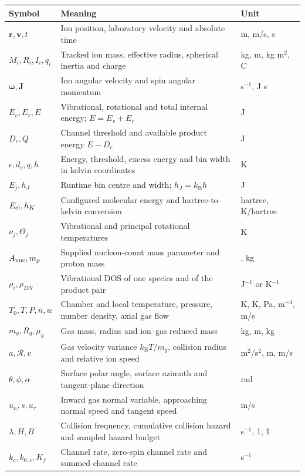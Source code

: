 \documentclass[10pt,a4paper]{article}
\newcommand{\kb}{k_{\mathrm B}}
\begin{document}
\begingroup\small
\begin{longtable}{@{}p{}p{}>{\raggedright\arraybackslash}p{}@{}}
\toprule Symbol & Meaning & Unit\\\midrule\endhead
$\mathbf r,\mathbf v,t$ & Ion position, laboratory velocity and absolute time & m, m/s, s\\
$M_i,R_i,I_i,q_i$ & Tracked ion mass, effective radius, spherical inertia and charge & kg, m, kg m$^2$, C\\
$\boldsymbol\omega,\mathbf J$ & Ion angular velocity and spin angular momentum & s$^{-1}$, J s\\
$E_v,E_r,E$ & Vibrational, rotational and total internal energy; $E=E_v+E_r$ & J\\
$D_c,Q$ & Channel threshold and available product energy $E-D_c$ & J\\
$\epsilon,d_c,q,h$ & Energy, threshold, excess energy and bin width in kelvin coordinates & K\\
$E_j,h_J$ & Runtime bin centre and width; $h_J=\kb h$ & J\\
$E_{\rm el},h_K$ & Configured molecular energy and hartree-to-kelvin conversion & hartree, K/hartree\\
$\nu_j,\Theta_j$ & Vibrational and principal rotational temperatures & K\\
$A_{\rm nuc},m_p$ & Supplied nucleon-count mass parameter and proton mass & 1, kg\\
$\rho_i,\rho_{DN}$ & Vibrational DOS of one species and of the product pair & J$^{-1}$ or K$^{-1}$\\
$T_0,T,P,n,w$ & Chamber and local temperature, pressure, number density, axial gas flow & K, K, Pa, m$^{-3}$, m/s\\
$m_g,R_g,\mu_g$ & Gas mass, radius and ion--gas reduced mass & kg, m, kg\\
$a,\mathcal R,v$ & Gas velocity variance $\kb T/m_g$, collision radius and relative ion speed & m$^2$/s$^2$, m, m/s\\
$\theta,\phi,\alpha$ & Surface polar angle, surface azimuth and tangent-plane direction & rad\\
$u_n,s,u_\tau$ & Inward gas normal variable, approaching normal speed and tangent speed & m/s\\
$\lambda,H,B$ & Collision frequency, cumulative collision hazard and sampled hazard budget & s$^{-1}$, 1, 1\\
$k_c,k_{0,c},K_f$ & Channel rate, zero-spin channel rate and summed channel rate & s$^{-1}$\\

\end{longtable}
\end{document}
